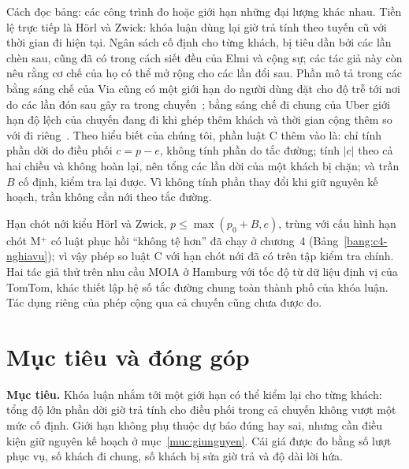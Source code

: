 Cách đọc bảng: các công trình đo hoặc giới hạn những đại lượng khác nhau. Tiền lệ trực tiếp là Hörl và
Zwick: khóa luận dùng lại giờ trả tính theo tuyến cũ với thời gian đi hiện tại. Ngân sách cố định cho từng
khách, bị tiêu dần bởi các lần chèn sau, cũng đã có trong cách siết đều của Elmi và cộng sự; các tác giả này
còn nêu rằng cơ chế của họ có thể mở rộng cho các lần đổi sau. Phần mô tả trong các bằng sáng chế của Via cũng có một
giới hạn do người dùng đặt cho độ trễ tới nơi do các lần đón sau gây ra trong chuyến~\cite{via2017patent,via2022patent};
bằng sáng chế đi chung của Uber giới hạn độ lệch của chuyến đang đi khi ghép thêm khách và thời gian cộng thêm so với đi
riêng~\cite{uber2021patent}. Theo hiểu biết của chúng tôi, phần luật C
thêm vào là: chỉ tính phần dời do điều phối $c = p - e$, không tính phần do tắc đường; tính $|c|$ theo cả hai
chiều và không hoàn lại, nên tổng các lần dời của một khách bị chặn; và trần $B$ cố định, kiểm tra lại được.
Vì không tính phần thay đổi khi giữ nguyên kế hoạch, trần không cần nới theo tắc đường.

Hạn chót nới kiểu Hörl và Zwick, $p \le \max(p_0 + B, e)$, trùng với cấu hình hạn chót M$^{+}$ có luật phục hồi
``không tệ hơn'' đã chạy ở chương~4 (Bảng~\ref{bang:c4-nghiavu}); vì vậy phép so luật C với hạn chót nới đã có trên
tập kiểm tra chính. Hai tác giả thử trên nhu cầu MOIA ở Hamburg với tốc độ từ dữ liệu định vị của TomTom,
khác thiết lập hệ số tắc đường chung toàn thành phố của khóa luận. Tác dụng riêng của phép cộng qua cả
chuyến cũng chưa được đo.

\section{Mục tiêu và đóng góp}
\label{muc:c1-donggop}

\noindent\textbf{Mục tiêu.} Khóa luận nhắm tới một giới hạn có thể kiểm lại cho từng khách: tổng độ lớn phần dời
giờ trả tính cho điều phối trong cả chuyến không vượt một mức cố định. Giới hạn không phụ thuộc dự báo đúng hay
sai, nhưng cần điều kiện giữ nguyên kế hoạch ở mục~\ref{muc:giunguyen}. Cái giá được đo bằng số lượt phục vụ,
số khách đi chung, số khách bị sửa giờ trả và độ dài lời hứa.

